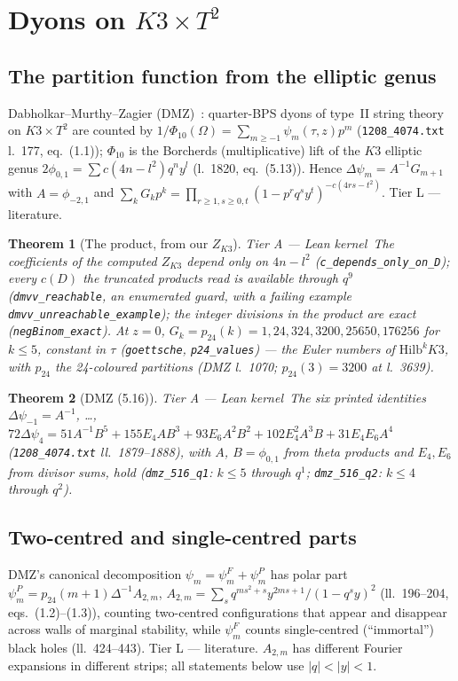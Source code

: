 \documentclass[11pt,a4paper]{article}
\newtheorem{theorem}{Theorem}[section]
\theoremstyle{remark}
\newcommand{\tierA}{\colorbox{green!15}{\textsf{\scriptsize Tier A --- Lean kernel}}}
\newcommand{\tierL}{\colorbox{blue!10}{\textsf{\scriptsize Tier L --- literature}}}
\newcommand{\lean}[1]{\texttt{#1}}
\begin{document}
\section{\texorpdfstring{Dyons on $K3\times T^2$}{Dyons on K3 x T2}}
\label{sec:dyons}

\subsection{The partition function from the elliptic genus}
Dabholkar--Murthy--Zagier (DMZ)~\cite{DMZ2012}: quarter-BPS dyons of type~II string theory on
$K3\times T^2$ are counted by $1/\Phi_{10}(\Omega)=\sum_{m\ge-1}\psi_m(\tau,z)p^m$ (\texttt{1208\_4074.txt}
l.~177, eq.~(1.1)); $\Phi_{10}$ is the Borcherds (multiplicative) lift of the $K3$ elliptic genus
$2\phi_{0,1}=\sum c(4n-l^2)q^ny^l$ (l.~1820, eq.~(5.13)). Hence $\Delta\psi_m=A^{-1}G_{m+1}$ with
$A=\phi_{-2,1}$ and $\sum_kG_kp^k=\prod_{r\ge1,s\ge0,t}(1-p^rq^sy^t)^{-c(4rs-t^2)}$. \tierL.

\begin{theorem}[The product, from our $Z_{K3}$] \tierA\
The coefficients of the computed $Z_{K3}$ depend only on $4n-l^2$ (\lean{c\_depends\_only\_on\_D});
every $c(D)$ the truncated products read is available through $q^9$ (\lean{dmvv\_reachable}, an
enumerated guard, with a failing example \lean{dmvv\_unreachable\_example}); the integer divisions in the
product are exact (\lean{negBinom\_exact}). At $z=0$, $G_k=p_{24}(k)=1,24,324,3200,25650,176256$ for
$k\le5$, constant in $\tau$ (\lean{goettsche}, \lean{p24\_values}) --- the Euler numbers of
$\mathrm{Hilb}^kK3$, with $p_{24}$ the 24-coloured partitions (DMZ l.~1070; $p_{24}(3)=3200$ at l.~3639).
\end{theorem}

\begin{theorem}[DMZ (5.16)] \tierA\
The six printed identities $\Delta\psi_{-1}=A^{-1}$, \dots,
$72\Delta\psi_4=51A^{-1}B^5+155E_4AB^3+93E_6A^2B^2+102E_4^2A^3B+31E_4E_6A^4$ (\texttt{1208\_4074.txt}
ll.~1879--1888), with $A$, $B=\phi_{0,1}$ from theta products and $E_4,E_6$ from divisor sums, hold
(\lean{dmz\_516\_q1}: $k\le5$ through $q^1$; \lean{dmz\_516\_q2}: $k\le4$ through $q^2$).
\end{theorem}

\subsection{Two-centred and single-centred parts}
DMZ's canonical decomposition $\psi_m=\psi_m^F+\psi_m^P$ has polar part
$\psi_m^P=p_{24}(m+1)\Delta^{-1}A_{2,m}$, $A_{2,m}=\sum_sq^{ms^2+s}y^{2ms+1}/(1-q^sy)^2$ (ll.~196--204,
eqs.~(1.2)--(1.3)), counting two-centred configurations that appear and disappear across walls of
marginal stability, while $\psi_m^F$ counts single-centred (``immortal'') black holes (ll.~424--443).
\tierL. $A_{2,m}$ has different Fourier expansions in different strips; all statements below use
$|q|<|y|<1$.
\end{document}
